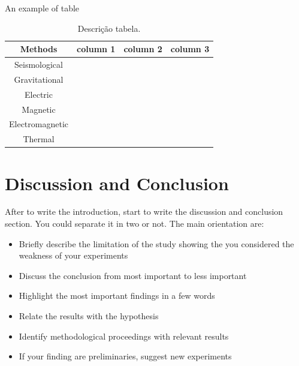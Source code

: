 \documentclass[twoside,letterpaper,twocolumn]{article}
\begin{document}
An example of table

\begin{table}[htb]
	\caption{Descrição tabela.}
	\label{tab:label1}
	\begin{tabular}{|c|c|c|c|}
		\hline 
		\textbf{Methods} & \textbf{column 1} & \textbf{column 2} & \textbf{column 3} \\ 
		\hline 
		Seismological    &  &  &  \\ 
		\hline 
		Gravitational    &  &  &  \\ 
		\hline 
		Electric         &  &  &  \\ 
		\hline 
		Magnetic         &  &  &  \\ 
		\hline 
		Electromagnetic  &  &  &  \\ 
		\hline 
		Thermal          &  &  &  \\ 
		\hline 
	\end{tabular} 
\end{table}


\section*{Discussion and Conclusion}

After to write the introduction, start to write the discussion and conclusion section. You could separate it in two or not. The main orientation are:

\begin{itemize}
	\item Briefly describe the limitation of the study showing the you considered the weakness of your experiments
	\item Discuss the conclusion from most important to less important
	\item Highlight the most important findings in a few words
	\item Relate the results with the hypothesis
	\item  Identify methodological proceedings with relevant results
	\item If your finding are preliminaries, suggest new experiments
	
\end{itemize}



\end{document}
